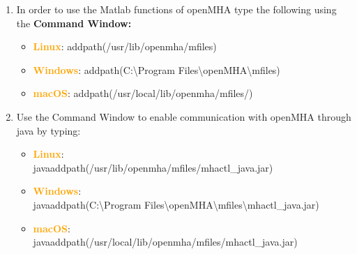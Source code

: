 \documentclass[11pt,a4paper,twoside]{article}
\newcommand{\+}{\discretionary{\mbox{\scriptsize$\hookleftarrow$}}{}{}}
\begin{document}
{{\begin{enumerate}
\begin{itemize}
\item \textcolor{orange}{\textbf{Linux}}: \textit{/usr/share/openmha/examples/05-frequency-shifting} 
\item \textcolor{orange}{\textbf{Windows}}: \textit{C:\textbackslash Program Files\textbackslash openMHA\textbackslash examples\textbackslash 05-frequency-shifting}
\item \textcolor{orange}{\textbf{macOS}}: \textit{/usr/local/share/openmha/examples/05-frequency-shifting} 
\end{itemize}

\item In order to use the Matlab functions of openMHA type the following using the \textbf{Command Window:} 

\begin{itemize}
\item \textcolor{orange}{\textbf{Linux}}:
  {\ttfamily addpath(\textquotesingle{}/usr/lib/openmha/mfiles\textquotesingle{})}
\item \textcolor{orange}{\textbf{Windows}}:
  {\ttfamily addpath(\textquotesingle{}C:\textbackslash Program Files\textbackslash openMHA\textbackslash mfiles\textquotesingle{})}
\item \textcolor{orange}{\textbf{macOS}}:
  {\ttfamily addpath(\textquotesingle{}/usr/local/lib/openmha/mfiles/\textquotesingle{})}
\end{itemize}


\item Use the Command Window to enable communication with openMHA through java by typing: 

\begin{itemize}
\item \textcolor{orange}{\textbf{Linux}}: \\{\ttfamily javaaddpath(\textquotesingle{}/usr/lib/openmha/mfiles/mhactl\_java.jar\textquotesingle{})} 
\item \textcolor{orange}{\textbf{Windows}}: \\ {\ttfamily javaaddpath(\textquotesingle{}C:\textbackslash Program Files\textbackslash openMHA\textbackslash mfiles\textbackslash mhactl\_java.jar\textquotesingle{})}
\item \textcolor{orange}{\textbf{macOS}}: \\ {\ttfamily javaaddpath(\textquotesingle{}/usr/local/lib/openmha/mfiles/mhactl\_java.jar\textquotesingle{})}
\end{itemize}


\end{enumerate}}}
\end{document}
